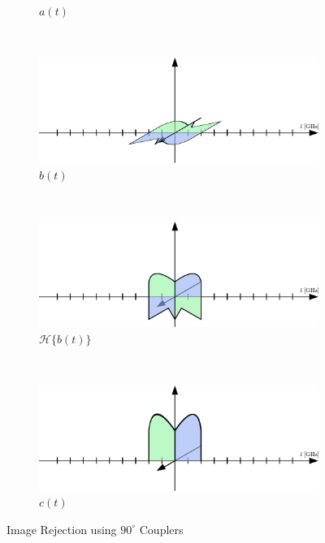 \begin{figure}[h!]
\begin{subfigure}{0.45\textwidth}
    \caption{$a(t)$}
    \label{fig:rx_rf_1_freq_a}
  \end{subfigure}
  ~
  \begin{subfigure}{0.45\textwidth}
    \centering
    \includegraphics[width=\textwidth]{figures/rx_rf_1_freq_b}
    \caption{$b(t)$}
    \label{fig:rx_rf_1_freq_b}
  \end{subfigure}
  \vspace{4ex} \\
  \begin{subfigure}{0.45\textwidth}
    \centering
    \includegraphics[width=\textwidth]{figures/rx_rf_1_freq_Hb}
    \caption{$\mathcal{H}\{b(t)\}$}
    \label{fig:rx_rf_1_freq_Hb}
  \end{subfigure}
  ~
  \begin{subfigure}{0.45\textwidth}
    \centering
    \includegraphics[width=\textwidth]{figures/rx_rf_1_freq_c}
    \caption{$c(t)$}
    \label{fig:rx_rf_1_freq_c}
  \end{subfigure}
  \caption{Image Rejection using $90^\circ$ Couplers}
  \label{fig:rx_rf_1_freq}
\end{figure}


